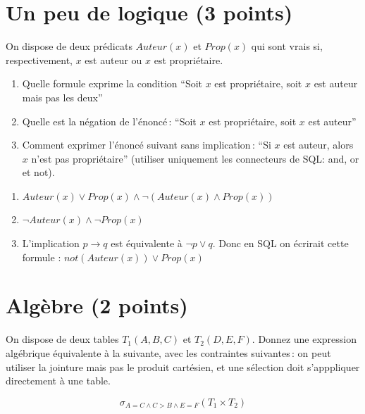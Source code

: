 \section{Un peu de logique (3 points)}

On dispose de deux prédicats $Auteur(x)$ et $Prop(x)$ qui sont vrais si,
respectivement, $x$ est auteur ou $x$ est propriétaire.

\begin{enumerate}
  \item Quelle formule exprime la condition ``Soit $x$  est propriétaire, soit $x$ est auteur mais pas les deux''

  \item Quelle est la négation de l'énoncé\,: ``Soit $x$ est propriétaire, soit $x$ est auteur''

  \item Comment exprimer l'énoncé suivant sans implication\,: ``Si $x$ est auteur, alors $x$ n'est pas propriétaire''
     (utiliser uniquement les connecteurs de SQL: and, or et not).
  
\end{enumerate}

\begin{solution}

\begin{enumerate}
  \item $Auteur(x) \lor Prop(x) \land \neg (Auteur(x) \land Prop(x))$

  \item $\neg Auteur(x) \land \neg Prop(x)$

  \item L'implication $p \to q$ est équivalente à $\neg p \lor q$.
       Donc en SQL on écrirait cette formule : $not(Auteur(x)) \lor Prop(x)$
  
\end{enumerate}


\end{solution}


\section{Algèbre (2 points)}
On dispose de deux tables $T_1(A,B,C)$ et $T_2(D,E,F)$. Donnez une  expression algébrique équivalente 
à la suivante, avec les contraintes suivantes\,: on peut utiliser  la jointure mais pas le  produit cartésien, et 
une sélection doit s'apppliquer directement à une table. 

$$\sigma_{A=C \land C > B \land E =F} (T_1 \times T_2)$$

